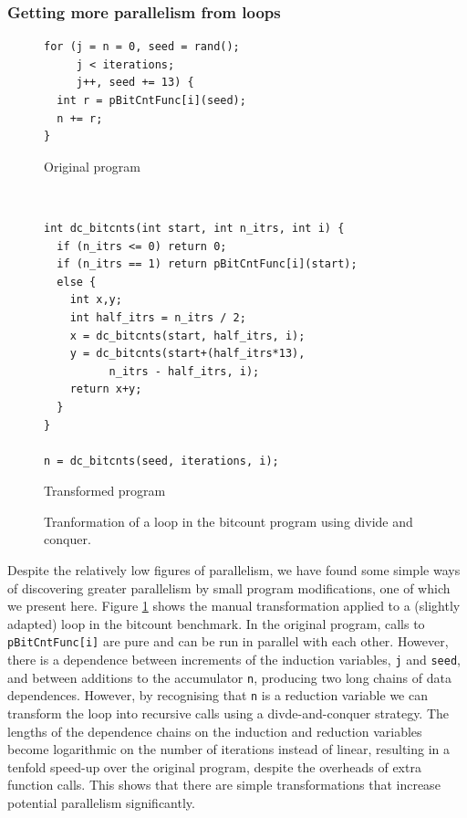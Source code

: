 \subsubsection{Getting more parallelism from loops}

\begin{figure}
  \centering
  \begin{subfloat}
    \begin{minipage}{3in}
      \begin{verbatim}
for (j = n = 0, seed = rand();
     j < iterations;
     j++, seed += 13) {
  int r = pBitCntFunc[i](seed);
  n += r;
}
      \end{verbatim}
    \end{minipage}%
    \label{orig}
    \caption{Original program}
  \end{subfloat}%
\\
  \begin{subfloat}
    \label{dnc-trans}
    \begin{minipage}{3in}
      \begin{verbatim}
int dc_bitcnts(int start, int n_itrs, int i) {
  if (n_itrs <= 0) return 0;
  if (n_itrs == 1) return pBitCntFunc[i](start);
  else {
    int x,y;
    int half_itrs = n_itrs / 2;
    x = dc_bitcnts(start, half_itrs, i);
    y = dc_bitcnts(start+(half_itrs*13),
          n_itrs - half_itrs, i);
    return x+y;
  }
}

n = dc_bitcnts(seed, iterations, i);
      \end{verbatim}
    \end{minipage}%
    \caption{Transformed program}
  \end{subfloat}%
  \caption{Tranformation of a loop in the bitcount program using divide and conquer.}
  \label{dnc}
\end{figure}

Despite the relatively low figures of parallelism, we have found some simple ways of discovering greater parallelism by small program modifications, one of which we present here.
Figure \ref{dnc} shows the manual transformation applied to a (slightly adapted) loop in the bitcount benchmark.
In the original program, calls to \texttt{pBitCntFunc[i]} are pure and can be run in parallel with each other.
However, there is a dependence between increments of the induction variables, \texttt{j} and \texttt{seed}, and between additions to the accumulator \texttt{n}, producing two long chains of data dependences.
However, by recognising that \texttt{n} is a reduction variable we can transform the loop into recursive calls using a divde-and-conquer strategy.
The lengths of the dependence chains on the induction and reduction variables become logarithmic on the number of iterations instead of linear, resulting in a tenfold speed-up over the original program, despite the overheads of extra function calls.
This shows that there are simple transformations that increase potential parallelism significantly.

